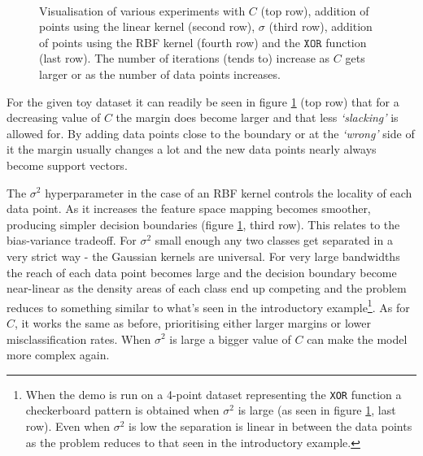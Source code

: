 \begin{figure}[ht]
\\
\caption{Visualisation of various experiments with $C$ (top row), addition of points using the linear kernel (second row), $\sigma$ (third row), addition of points using the RBF kernel (fourth row) and the $\texttt{XOR}$ function (last row). The number of iterations (tends to) increase as $C$ gets larger or as the number of data points increases.}
\label{stanfordexample}
\end{figure}
\clearpage

\par\noindent For the given toy dataset it can readily be seen in figure \ref{stanfordexample} (top row) that for a decreasing value of $C$ the margin does become larger and that less \textit{`slacking'} is allowed for. By adding data points close to the boundary or at the \textit{`wrong'} side of it the margin usually changes a lot and the new data points nearly always become support vectors.

The $\sigma^2$ hyperparameter in the case of an RBF kernel controls the locality of each data point. As it increases the feature space mapping becomes smoother, producing simpler decision boundaries (figure \ref{stanfordexample}, third row). This relates to the bias-variance tradeoff. For $\sigma^2$ small enough any two classes get separated in a very strict way - the Gaussian kernels are universal. For very large bandwidths the reach of each data point becomes large and the decision boundary become near-linear as the density areas of each class end up competing and the problem reduces to something similar to what's seen in the introductory example\footnote{When the demo is run on a 4-point dataset representing the \texttt{XOR} function a checkerboard pattern is obtained when $\sigma^2$ is large (as seen in figure \ref{stanfordexample}, last row). Even when $\sigma^2$ is low the separation is linear in between the data points as the problem reduces to that seen in the introductory example.}. As for $C$, it works the same as before, prioritising either larger margins or lower misclassification rates. When $\sigma^2$ is large a bigger value of $C$ can make the model more complex again. 

